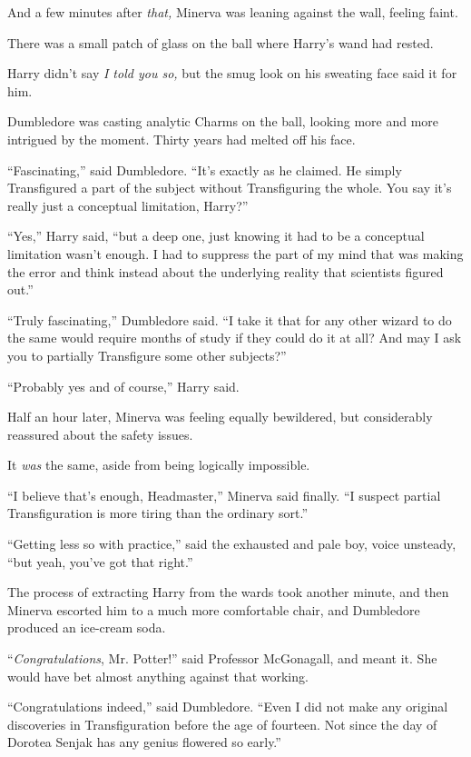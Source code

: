 And a few minutes after \emph{that,} Minerva was leaning against the
wall, feeling faint.

There was a small patch of glass on the ball where Harry's wand had
rested.

Harry didn't say \emph{I told you so,} but the smug look on his sweating
face said it for him.

Dumbledore was casting analytic Charms on the ball, looking more and
more intrigued by the moment. Thirty years had melted off his face.

``Fascinating,'' said Dumbledore. ``It's exactly as he claimed. He
simply Transfigured a part of the subject without Transfiguring the
whole. You say it's really just a conceptual limitation, Harry?''

``Yes,'' Harry said, ``but a deep one, just knowing it had to be a
conceptual limitation wasn't enough. I had to suppress the part of my
mind that was making the error and think instead about the underlying
reality that scientists figured out.''

``Truly fascinating,'' Dumbledore said. ``I take it that for any other
wizard to do the same would require months of study if they could do it
at all? And may I ask you to partially Transfigure some other
subjects?''

``Probably yes and of course,'' Harry said.

Half an hour later, Minerva was feeling equally bewildered, but
considerably reassured about the safety issues.

It \emph{was} the same, aside from being logically impossible.

``I believe that's enough, Headmaster,'' Minerva said finally. ``I
suspect partial Transfiguration is more tiring than the ordinary sort.''

``Getting less so with practice,'' said the exhausted and pale boy,
voice unsteady, ``but yeah, you've got that right.''

The process of extracting Harry from the wards took another minute, and
then Minerva escorted him to a much more comfortable chair, and
Dumbledore produced an ice-cream soda.

``\emph{Congratulations}, Mr. Potter!'' said Professor McGonagall, and
meant it. She would have bet almost anything against that working.

``Congratulations indeed,'' said Dumbledore. ``Even I did not make any
original discoveries in Transfiguration before the age of fourteen. Not
since the day of Dorotea Senjak has any genius flowered so early.''

